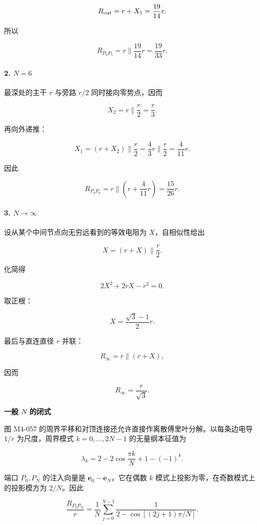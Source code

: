 \[
R_{\rm out}=r+X_1=\frac{19}{14}r.
\]

所以

\[
\boxed{R_{P_0P_5}=r\parallel\frac{19}{14}r=\frac{19}{33}r}.
\]

\paragraph{\texorpdfstring{2. \(N=6\)}{2. N=6}}\label{m4:n6}

最深处的主干 \(r\) 与旁路 \(r/2\) 同时接向零势点，因而

\[
X_2=r\parallel\frac r2=\frac r3.
\]

再向外递推：

\[
X_1=(r+X_2)\parallel\frac r2
=\frac43r\parallel\frac r2
=\frac4{11}r.
\]

因此

\[
\boxed{R_{P_0P_6}=r\parallel\left(r+\frac4{11}r\right)
=\frac{15}{26}r}.
\]

\paragraph{\texorpdfstring{3.
\(N\to\infty\)}{3. N\textbackslash to\textbackslash infty}}\label{m4:ntoinfty}

设从某个中间节点向无穷远看到的等效电阻为 \(X\)，自相似性给出

\[
X=(r+X)\parallel\frac r2.
\]

化简得

\[
2X^2+2rX-r^2=0.
\]

取正根：

\[
X=\frac{\sqrt3-1}{2}r.
\]

最后与直连直径 \(r\) 并联：

\[
R_{\infty}=r\parallel(r+X),
\]

因而

\[
\boxed{R_{\infty}=\frac r{\sqrt3}}.
\]

\textbf{一般 \(N\) 的闭式}

图 M4-057 的周界平移和对顶连接还允许直接作离散傅里叶分解。以每条边电导
\(1/r\) 为尺度，周界模式 \(k=0,\ldots,2N-1\) 的无量纲本征值为

\[
\lambda_k=2-2\cos\frac{\pi k}{N}+1-(-1)^k.
\]

端口 \(P_0,P_N\) 的注入向量是 \(\mathbf e_0-\mathbf e_N\)，它在偶数
\(k\) 模式上投影为零，在奇数模式上的投影模方为 \(2/N\)。因此

\[
\frac{R_{P_0P_N}}r
=\frac1N\sum_{j=0}^{N-1}
\frac1{2-\cos[(2j+1)\pi/N]}.
\]

